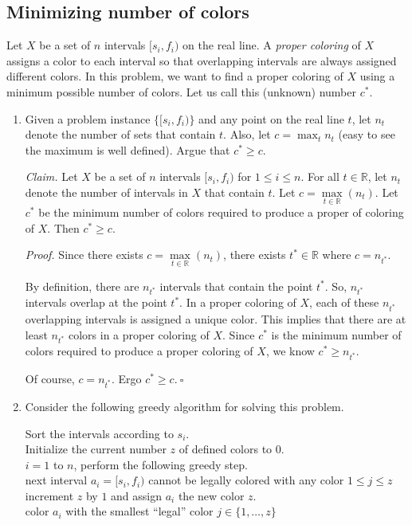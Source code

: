 \subsection{Minimizing number of colors}
Let $X$ be a set of $n$ intervals $[s_i, f_i)$ on the real line. A {\em proper coloring} of $X$ assigns a color to each interval so that overlapping intervals are always assigned different colors.  In this problem, we want to find a proper coloring of $X$ using a minimum possible number of colors. Let us call this (unknown) number $c^*$.
\begin{enumerate}
\item Given a problem instance $\{[s_i,f_i)\}$ and any point on the real line $t$, let $n_t$ denote the number of sets that contain $t$. Also, let $c = \max_t n_t$ (easy to see the maximum is well defined). Argue that $c^*\ge c$.
\begin{solution}
\textit{Claim. }Let $X$ be a set of $n$ intervals $[s_i,f_i)$ for $1\leq i\leq n$. For all $t\in\mathbb{R}$, let $n_t$ denote the number of intervals in $X$ that contain $t$. Let $c=\underset{t\in\mathbb{R}}{\max}(n_t)$. Let $c^*$ be the minimum number of colors required to produce a proper of coloring of $X$. Then $c^*\geq c$.

\textit{Proof. }Since there exists $c=\underset{t\in\mathbb{R}}{\max}(n_t)$, there exists $t^*\in\mathbb{R}$ where $c=n_{t^*}$.

By definition, there are $n_{t^*}$ intervals that contain the point $t^*$. So, $n_{t^*}$ intervals overlap at the point $t^*$. In a proper coloring of $X$, each of these $n_{t^*}$ overlapping intervals is assigned a unique color. This implies that there are at least $n_{t^*}$ colors in a proper coloring of $X$. Since $c^*$ is the minimum number of colors required to produce a proper coloring of $X$, we know $c^*\geq n_{t^*}$.

Of course, $c=n_{t^*}$. Ergo $c^*\geq c.~\square$
\end{solution}
\item Consider the following greedy algorithm for solving this problem.
    \vspace*{-1ex}
    \begin{code}
    \> Sort the intervals according to $s_i$. \\
    \> Initialize the current number $z$ of defined colors to $0$. \\
    \> \For $i = 1$ to $n$, perform the following greedy step. \\
    \> \> \If next interval $a_i = [s_i, f_i)$ cannot be legally colored
    with any color $1\le j\le z$\\
    \> \> \Then increment $z$ by $1$ and assign $a_i$ the new color $z$.\\
    \> \> \Else color $a_i$ with the smallest ``legal'' color
    $j\in \{1, \ldots, z\}$  \\
    \end{code}


\end{enumerate}
